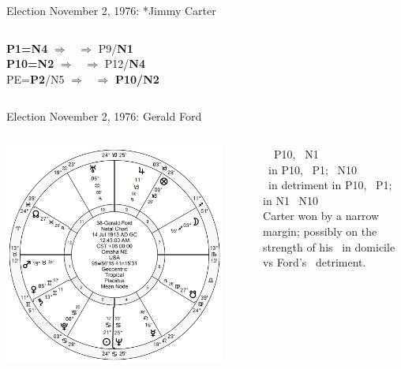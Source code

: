 \begin{frame}[t]{Election November 2, 1976: *Jimmy Carter}
\begin{columns}[T, onlytextwidth]
\textbf{\dgreen P1=N4} 
	$\Rightarrow$ \Saturn\, $\Rightarrow$ P9/\textbf{\dgreen N1}\\
\textbf{\red P10=N2}
	$\Rightarrow$ \Mars\, $\Rightarrow$ P12/\textbf{\dgreen N4}\\
PE=\textbf{\red P2}/N5
	 $\Rightarrow$ \Jupiter\, $\Rightarrow$ \textbf{\red P10/N2}


\end{columns}
\end{frame}

\begin{frame}[t]{Election November 2, 1976: Gerald Ford}
\small
\begin{columns}[T, onlytextwidth]
\vspace{-1em}
{\includegraphics[width=0.9\textwidth]{charts/Ford.png}}
\fontsize{7pt}{8pt}\selectfont

\Sun\, \Sextile\, P10, \Sextile\, N1 \\
\Venus\, in P10, \Square\, P1; \Trine\, N10 \\
\Mars\, in detriment in P10, \Square\, P1; in N1 \Sextile\, N10 \\
\vspace{0.5em}
Carter won by a narrow margin; possibly on the strength of his \Jupiter\, in domicile vs Ford's \Mars\, detriment.


\end{columns}
\end{frame}
